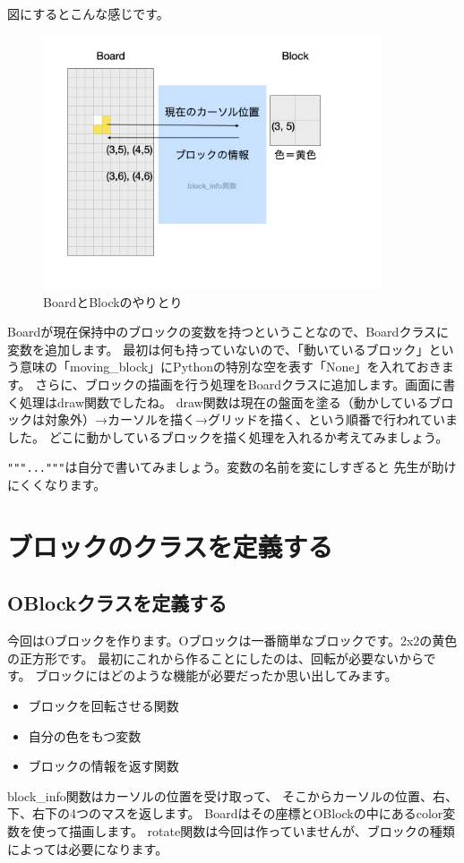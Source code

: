 \documentclass[12pt, a4paper, dvipdfmx]{book}
\begin{document}
図にするとこんな感じです。
\begin{figure}[h]
  \centering
  \includegraphics[width=100mm]{IMG_6553.png}
  \caption{BoardとBlockのやりとり}
\end{figure}

Boardが現在保持中のブロックの変数を持つということなので、Boardクラスに変数を追加します。
最初は何も持っていないので、「動いているブロック」という意味の「moving\_block」にPythonの特別な空を表す「None」を入れておきます。
さらに、ブロックの描画を行う処理をBoardクラスに追加します。画面に書く処理はdraw関数でしたね。
draw関数は現在の盤面を塗る（動かしているブロックは対象外）→カーソルを描く→グリッドを描く、という順番で行われていました。
どこに動かしているブロックを描く処理を入れるか考えてみましょう。

\texttt{"""..."""}は自分で書いてみましょう。変数の名前を変にしすぎると
先生が助けにくくなります。

\section{ブロックのクラスを定義する}
\subsection{OBlockクラスを定義する}
今回はOブロックを作ります。Oブロックは一番簡単なブロックです。2x2の黄色の正方形です。
最初にこれから作ることにしたのは、回転が必要ないからです。
ブロックにはどのような機能が必要だったか思い出してみます。
\begin{itemize}
  \item ブロックを回転させる関数
  \item 自分の色をもつ変数
  \item ブロックの情報を返す関数
\end{itemize}
\newpage

block\_info関数はカーソルの位置を受け取って、
そこからカーソルの位置、右、下、右下の4つのマスを返します。
Boardはその座標とOBlockの中にあるcolor変数を使って描画します。
rotate関数は今回は作っていませんが、ブロックの種類によっては必要になります。
\end{document}
